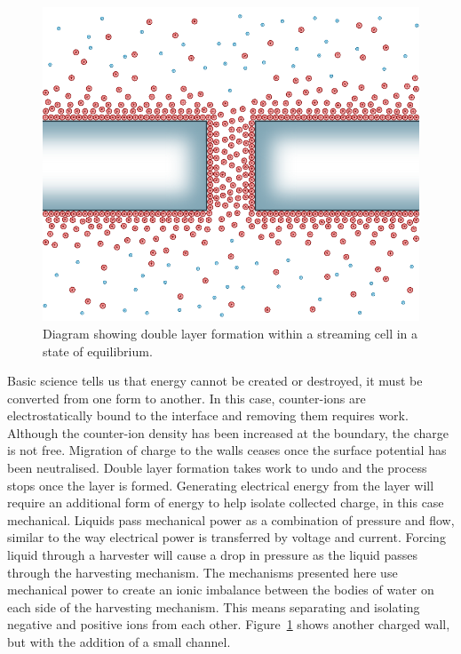   \begin{figure}
      \centering
      \includegraphics{content/pt1/01-PowerHarvesting/graphics/intro_2_channel_relaxed}
      \caption{
        \label{fig:doubleLayerInChannel_noPressure}
        Diagram showing double layer formation within a streaming cell in a state of equilibrium.
      }
  \end{figure}
  Basic science tells us that energy cannot be created or destroyed, it must be converted from one form to another.
  In this case, counter-ions are electrostatically bound to the interface and removing them requires work.
  Although the counter-ion density has been increased at the boundary, the charge is not free.
  Migration of charge to the walls ceases once the surface potential has been neutralised.
  Double layer formation takes work to undo and the process stops once the layer is formed.
  Generating electrical energy from the layer will require an additional form of energy to help isolate collected charge, in this case mechanical.
  Liquids pass mechanical power as a combination of pressure and flow, similar to the way electrical power is transferred by voltage and current.
  Forcing liquid through a harvester will cause a drop in pressure as the liquid passes through the harvesting mechanism.
  The mechanisms presented here use mechanical power to create an ionic imbalance between the bodies of water on each side of the harvesting mechanism.
  This means separating and isolating negative and positive ions from each other.
  Figure~\ref{fig:doubleLayerInChannel_noPressure} shows another charged wall, but with the addition of a small channel.
